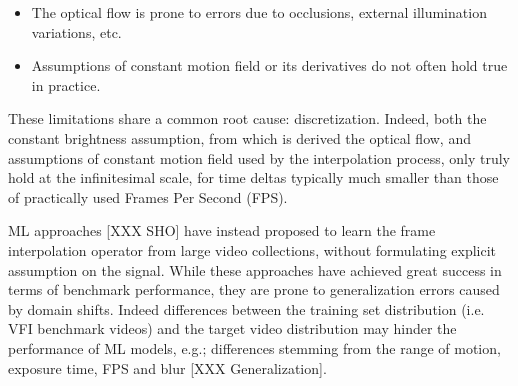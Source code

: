 \documentclass{article}
\begin{document}
\begin{itemize}
\item The optical flow is prone to errors due to occlusions, external illumination variations, etc.
\item Assumptions of constant motion field or its derivatives do not often hold true in practice.
\end{itemize}

These limitations share a common root cause: discretization.
Indeed, both the constant brightness assumption, from which is derived the optical flow,
and assumptions of constant motion field used by the interpolation process,
only truly hold at the infinitesimal scale, for time deltas typically much smaller than those of practically used Frames Per Second (FPS).

ML approaches [XXX SHO] have instead proposed to learn the frame interpolation operator from large video collections,
without formulating explicit assumption on the signal.
While these approaches have achieved great success in terms of benchmark performance,
they are prone to generalization errors caused by domain shifts. %
Indeed differences between the training set distribution (i.e. VFI benchmark videos)
and the target video distribution may hinder the performance of ML models, e.g.;
differences stemming from the range of motion, exposure time, FPS and blur [XXX Generalization].
\end{document}
